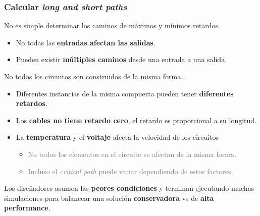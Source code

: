 \documentclass[aspectratio=169]{beamer}
\begin{document}
\begin{frame}[fragile,t]
    \frametitle{Calcular \emph{long and short paths}}
    \textcolor{verdeuca}{No es simple determinar los caminos de máximos y mínimos retardos.}\\
    \begin{itemize}
    \item No todas las \textbf{entradas afectan las salidas}.
    \item Pueden existir \textbf{múltiples caminos} desde una entrada a una salida.
    \end{itemize}
    \pause
    \bigskip
    \textcolor{verdeuca}{No todos los circuitos son construidos de la misma forma.}\\
    \begin{itemize}
    \item Diferentes instancias de la misma compuerta pueden tener \textbf{diferentes retardos}.
    \item Los \textbf{cables no tiene retardo cero}, el retardo es proporcional a su longitud.
    \item La \textbf{temperatura} y el \textbf{voltaje} afecta la velocidad de los circuitos
    \begin{itemize}
    \item \textcolor{gray}{No todos los elementos en el circuito se afectan de la misma forma.}
    \item \textcolor{gray}{Incluso el \emph{critical path} puede variar dependiendo de estos factores.}
    \end{itemize}
    \end{itemize}
    \pause
    \begin{center}
    \textcolor{naranjauca}{
    Los diseñadores asumen las \textbf{peores condiciones} y terminan ejecutando muchas\\
    simulaciones para balancear una solución \textbf{conservadora} vs de \textbf{alta performance}.}
    \end{center}
\end{frame}
\end{document}
